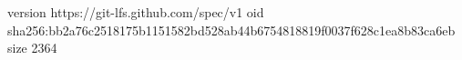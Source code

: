 version https://git-lfs.github.com/spec/v1
oid sha256:bb2a76c2518175b1151582bd528ab44b6754818819f0037f628c1ea8b83ca6eb
size 2364
